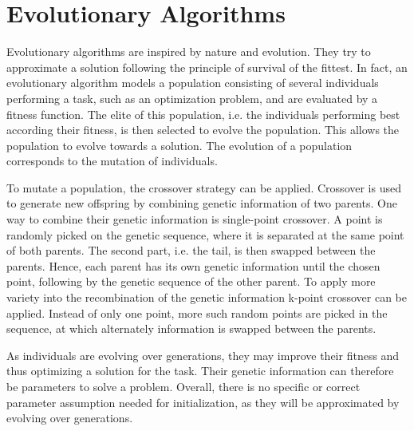 \section{Evolutionary Algorithms}
Evolutionary algorithms are inspired by nature and evolution.
They try to approximate a solution following the principle of survival of the fittest.
In fact, an evolutionary algorithm models a population consisting of several individuals performing a task, such as an optimization problem, and are evaluated by a fitness function.
The elite of this population, i.e. the individuals performing best according their fitness, is then selected to evolve the population.
This allows the population to evolve towards a solution.
The evolution of a population corresponds to the mutation of individuals. 

To mutate a population, the crossover strategy can be applied.
Crossover is used to generate new offspring by combining genetic information of two parents.
One way to combine their genetic information is single-point crossover.
A point is randomly picked on the genetic sequence, where it is separated at the same point of both parents.
The second part, i.e. the tail, is then swapped between the parents.
Hence, each parent has its own genetic information until the chosen point, following by the genetic sequence of the other parent.
To apply more variety into the recombination of the genetic information k-point crossover can be applied.
Instead of only one point, more such random points are picked in the sequence, at which alternately information is swapped between the parents.

As individuals are evolving over generations, they may improve their fitness and thus optimizing a solution for the task.
Their genetic information can therefore be parameters to solve a problem.
Overall, there is no specific or correct parameter assumption needed for initialization, as they will be approximated by evolving over generations.